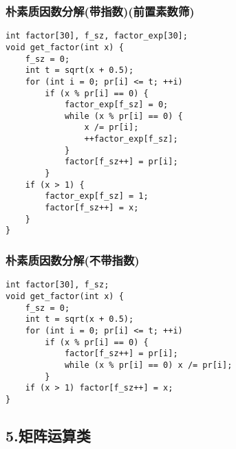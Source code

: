\documentclass[]{article}
\begin{document}
\hypertarget{ux6734ux7d20ux8d28ux56e0ux6570ux5206ux89e3ux5e26ux6307ux6570ux524dux7f6eux7d20ux6570ux7b5b}{%
\subsubsection{朴素质因数分解(带指数)(前置素数筛)}\label{ux6734ux7d20ux8d28ux56e0ux6570ux5206ux89e3ux5e26ux6307ux6570ux524dux7f6eux7d20ux6570ux7b5b}}

\begin{verbatim}
int factor[30], f_sz, factor_exp[30];
void get_factor(int x) {
    f_sz = 0;
    int t = sqrt(x + 0.5);
    for (int i = 0; pr[i] <= t; ++i)
        if (x % pr[i] == 0) {
            factor_exp[f_sz] = 0;
            while (x % pr[i] == 0) {
                x /= pr[i];
                ++factor_exp[f_sz];
            }
            factor[f_sz++] = pr[i];
        }
    if (x > 1) {
        factor_exp[f_sz] = 1;
        factor[f_sz++] = x;
    }
}
\end{verbatim}

\hypertarget{ux6734ux7d20ux8d28ux56e0ux6570ux5206ux89e3ux4e0dux5e26ux6307ux6570}{%
\subsubsection{朴素质因数分解(不带指数)}\label{ux6734ux7d20ux8d28ux56e0ux6570ux5206ux89e3ux4e0dux5e26ux6307ux6570}}

\begin{verbatim}
int factor[30], f_sz;
void get_factor(int x) {
    f_sz = 0;
    int t = sqrt(x + 0.5);
    for (int i = 0; pr[i] <= t; ++i)
        if (x % pr[i] == 0) {
            factor[f_sz++] = pr[i];
            while (x % pr[i] == 0) x /= pr[i];
        }
    if (x > 1) factor[f_sz++] = x;
}
\end{verbatim}

\hypertarget{ux77e9ux9635ux8fd0ux7b97ux7c7b}{%
\subsection{5.矩阵运算类}\label{ux77e9ux9635ux8fd0ux7b97ux7c7b}}
\end{document}
